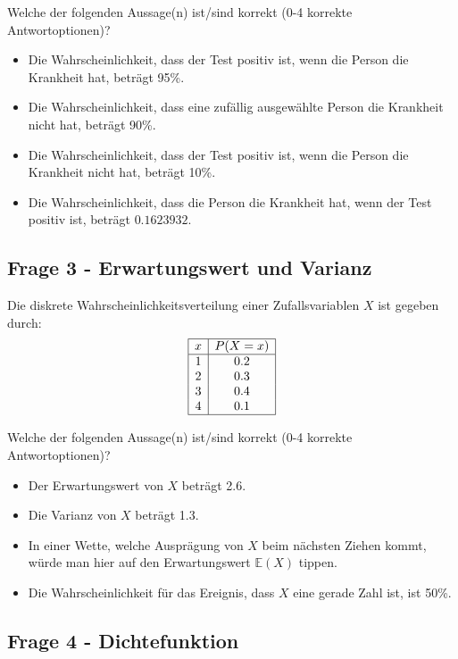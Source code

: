 \documentclass[
]{book}
\providecommand{\tightlist}{%
  \setlength{\itemsep}{0pt}\setlength{\parskip}{0pt}}
\begin{document}
Welche der folgenden Aussage(n) ist/sind korrekt (0-4 korrekte Antwortoptionen)?

\begin{itemize}
\tightlist
\item
  Die Wahrscheinlichkeit, dass der Test positiv ist, wenn die Person die Krankheit hat, beträgt 95\%.
\item
  Die Wahrscheinlichkeit, dass eine zufällig ausgewählte Person die Krankheit nicht hat, beträgt 90\%.
\item
  Die Wahrscheinlichkeit, dass der Test positiv ist, wenn die Person die Krankheit nicht hat, beträgt 10\%.
\item
  Die Wahrscheinlichkeit, dass die Person die Krankheit hat, wenn der Test positiv ist, beträgt \(0.1623932\).
\end{itemize}

\subsection{Frage 3 - Erwartungswert und Varianz}\label{frage-3---erwartungswert-und-varianz}

Die diskrete Wahrscheinlichkeitsverteilung einer Zufallsvariablen \(X\) ist gegeben durch:
\[
\begin{array}{|c|c|}
\hline
x & P(X = x) \\
\hline
1 & 0.2 \\
2 & 0.3 \\
3 & 0.4 \\
4 & 0.1 \\
\hline
\end{array}
\]

Welche der folgenden Aussage(n) ist/sind korrekt (0-4 korrekte Antwortoptionen)?

\begin{itemize}
\tightlist
\item
  Der Erwartungswert von \(X\) beträgt 2.6.
\item
  Die Varianz von \(X\) beträgt 1.3.
\item
  In einer Wette, welche Ausprägung von \(X\) beim nächsten Ziehen kommt,
  würde man hier auf den Erwartungswert \(\mathbb{E}(X)\) tippen.
\item
  Die Wahrscheinlichkeit für das Ereignis, dass \(X\) eine gerade Zahl ist, ist 50\%.
\end{itemize}

\subsection{Frage 4 - Dichtefunktion}\label{frage-4---dichtefunktion}
\end{document}
